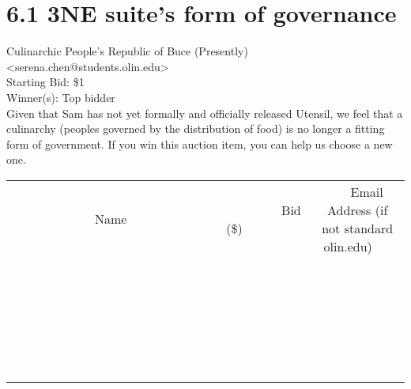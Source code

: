 \documentclass[11pt]{article}
\begin{document}
					\section*{6.1 3NE suite's form of governance}
					Culinarchic People's Republic of Buce (Presently) <serena.chen@students.olin.edu> \\
					Starting Bid: \$1 \\
					Winner(s): Top bidder \\
					Given that Sam has not yet formally and officially released Utensil, we feel that a culinarchy (peoples governed by the distribution of food) is no longer a fitting form of government. If you win this auction item, you can help us choose a new one. \\
					[6ex]
					\begin{tabular}{c c c}
						~~~~~~~~~~~~~Name~~~~~~~~~~~~~ & ~~~~~~~~~Bid (\$)~~~~~~~~~ & ~~~Email Address (if not standard olin.edu)~~~ \\
				
 & & \\
\hline
 & & \\
\hline
 & & \\
\hline
 & & \\
\hline
 & & \\
\hline
 & & \\
\hline
 & & \\
\hline
 & & \\
\hline
 & & \\
\hline
 & & \\
\hline
 & & \\
\hline
 & & \\
\hline
 & & \\
\hline
 & & \\
\hline
 & & \\
\hline
 & & \\
\hline
 & & \\
\hline
 & & \\
\hline
 & & \\
\hline
 & & \\
\hline
 & & \\
\hline
 & & \\
\hline
 & & \\
\hline
 & & \\
\hline
 & & \\
\hline
 & & \\
\hline
					\end{tabular}
					\clearpage
				
\end{document}
